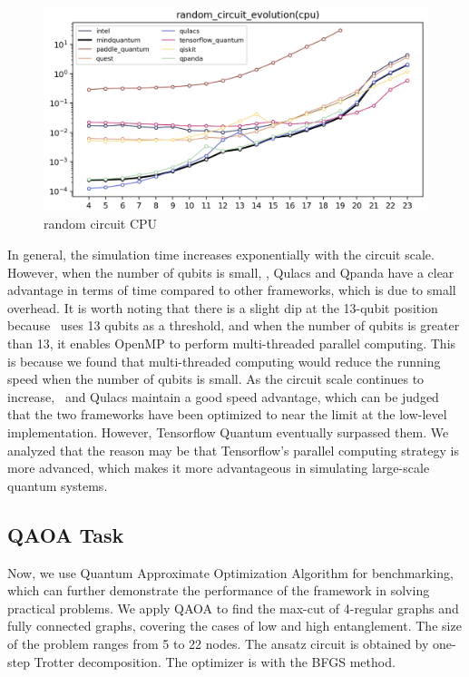 \begin{figure}[htbp]
    \begin{center}
        \includegraphics[width=0.7\linewidth]{7_figures/random_circuit_CPU.png}
    \end{center}
    \caption{random circuit CPU}
\end{figure}

In general, the simulation time increases exponentially with the circuit scale. However, when the number of qubits is small, \MindQuantum, Qulacs and Qpanda have a clear advantage in terms of time compared to other frameworks, which is due to small overhead. It is worth noting that there is a slight dip at the 13-qubit position because \MindQuantum\ uses 13 qubits as a threshold, and when the number of qubits is greater than 13, it enables OpenMP to perform multi-threaded parallel computing. This is because we found that multi-threaded computing would reduce the running speed when the number of qubits is small. As the circuit scale continues to increase, \MindQuantum\ and Qulacs maintain a good speed advantage, which can be judged that the two frameworks have been optimized to near the limit at the low-level implementation. However, Tensorflow Quantum eventually surpassed them. We analyzed that the reason may be that Tensorflow’s parallel computing strategy is more advanced, which makes it more advantageous in simulating large-scale quantum systems.

\subsection{QAOA Task}

Now, we use Quantum Approximate Optimization Algorithm for benchmarking, which can further demonstrate the performance of the framework in solving practical problems. We apply QAOA to find the max-cut of 4-regular graphs and fully connected graphs, covering the cases of low and high entanglement. The size of the problem ranges from 5 to 22 nodes. The ansatz circuit is obtained by one-step Trotter decomposition. The optimizer is  with the BFGS method.

